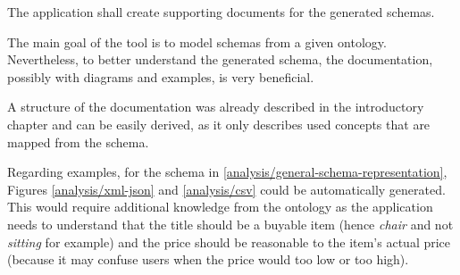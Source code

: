 \begin{requirement}
    The application shall create supporting documents for the generated schemas.
\end{requirement}

The main goal of the tool is to model schemas from a given ontology. Nevertheless, to better understand the generated schema, the documentation, possibly with diagrams and examples, is very beneficial.

A structure of the documentation was already described in the introductory chapter and can be easily derived, as it only describes used concepts that are mapped from the schema.

Regarding examples, for the schema in \autoref{analysis/general-schema-representation}, Figures \ref{analysis/xml-json} and \ref{analysis/csv} could be automatically generated. This would require additional knowledge from the ontology as the application needs to understand that the title should be a buyable item (hence \textit{chair} and not \textit{sitting} for example) and the price should be reasonable to the item's actual price (because it may confuse users when the price would too low or too high).